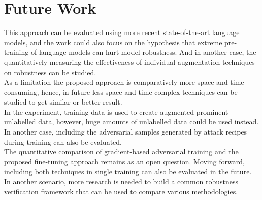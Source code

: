 \documentclass[%
	BCOR=8mm, %
	DIV=12,
	toc=bibliography, %
	toc=listof, %
	oneside, %
	egregdoesnotlikesansseriftitles, %
	]{scrbook}
\begin{document}
\section{Future Work }
\label{section:futurework}
This approach can be evaluated using more recent state-of-the-art language models, and the work could also focus on the hypothesis that extreme pre-training of language models can hurt model robustness. And in another case, the quantitatively measuring the effectiveness of individual augmentation techniques on robustness can be studied.\\
As a limitation the proposed approach is comparatively more space and time consuming, hence, in future less space and time complex techniques can be studied to get similar or better result. \\
In the experiment, training data is used to create augmented prominent unlabelled data, however,  huge amounts of unlabelled data could be used instead. In another case, including the adversarial samples generated by attack recipes during training can also be evaluated. \\
The quantitative comparison of gradient-based adversarial training and the proposed fine-tuning approach remains as an open question. Moving forward, including both techniques in single training can also be evaluated in the future. In another scenario, more research is needed to build a common robustness verification framework that can be used to compare various methodologies.






%
%
\printbibliography
\end{document}
